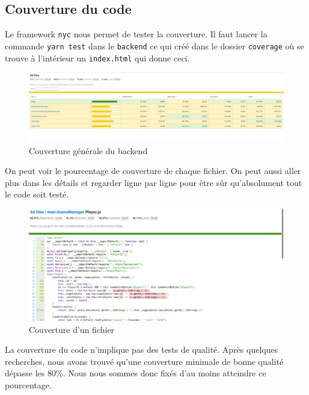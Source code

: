 \subsection{Couverture du code}

Le framework {\tt nyc} nous permet de tester la couverture. Il faut lancer la commande {\tt yarn test} dans le \lstinline{backend} ce qui créé dans le dossier \lstinline{coverage} où se trouve à l'intérieur un \lstinline{index.html} qui donne ceci.

\begin{figure}[H]
    \centering
    \includegraphics[scale=0.35]{data/couverture_test_1.jpg}
    \caption{Couverture générale du backend}
\end{figure}

On peut voir le pourcentage de couverture de chaque fichier. On peut aussi aller plus dans les détails et regarder ligne par ligne pour être sûr qu'absolument tout le code soit testé.

\begin{figure}[H]
    \centering
    \includegraphics[scale=0.3]{data/couverture_test_2.png}
    \caption{Couverture d'un fichier}
\end{figure}

La couverture du code n'implique pas des tests de qualité. Après quelques recherches, nous avons trouvé qu'une couverture minimale de bonne qualité dépasse les 80\%. Nous nous sommes donc fixés d'au moins atteindre ce pourcentage.